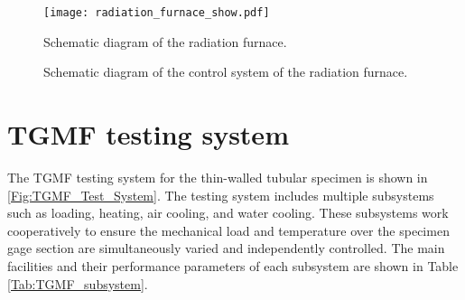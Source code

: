 \begin{figure}[!htp]
	\centering
	\texttt{[image: radiation\_furnace\_show.pdf]}
	\caption{Schematic diagram of the radiation furnace.}
	\label{Fig:radiation_furnace_show}
\end{figure}

\begin{figure}[!htp]
\centering{}
\caption{Schematic diagram of the control system of the radiation furnace.}
\label{Fig:Radiation_Furnace}
\end{figure}





\section{TGMF testing system}
\noindent
The TGMF testing system for the thin-walled tubular specimen is shown in \ref{Fig:TGMF_Test_System}. The testing system includes multiple subsystems such as loading, heating,  air cooling, and water cooling. These subsystems work cooperatively to ensure the mechanical load and temperature over the specimen gage section are simultaneously varied and independently controlled. The main facilities and their performance parameters of each subsystem are shown in Table \ref{Tab:TGMF_subsystem}.

